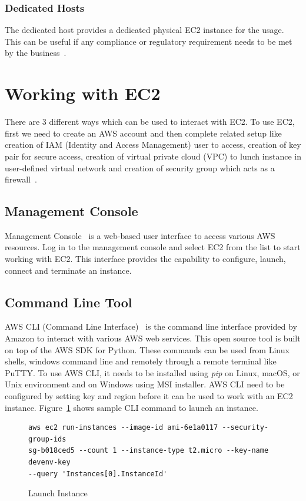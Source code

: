 \subsubsection{Dedicated Hosts} 
The dedicated host provides a dedicated physical EC2 instance for the
usage. This can be useful if any compliance or regulatory requirement
needs to be met by the
business~\cite{hid-sp18-402-www-aws-ec2Pricing}.

\section{Working with EC2}
There are 3 different ways which can be used to interact with EC2. To
use EC2, first we need to create an AWS account and then complete
related setup like creation of IAM (Identity and Access Management)
user to access, creation of key pair for secure access, creation of
virtual private cloud (VPC) to lunch instance in user-defined virtual
network and creation of security group which acts as a
firewall~\cite{hid-sp18-402-www-aws-ec2-setup}.

\subsection{Management Console}
Management Console~\cite{hid-sp18-402-www-aws-ec2-gettingStarted} is a
web-based user interface to access various AWS resources. Log in to
the management console and select EC2 from the list to start working
with EC2. This interface provides the capability to configure, launch,
connect and terminate an instance.

\subsection{Command Line Tool}
AWS CLI (Command Line Interface)~\cite{hid-sp18-402-www-aws-ec2-cli}
is the command line interface provided by Amazon to interact with
various AWS web services. This open source tool is built on top of the
AWS SDK for Python. These commands can be used from Linux shells,
windows command line and remotely through a remote terminal like
PuTTY. To use AWS CLI, it needs to be installed using \emph{pip} on
Linux, macOS, or Unix environment and on Windows using MSI
installer. AWS CLI need to be configured by setting key and region
before it can be used to work with an EC2 instance.
Figure~\ref{c:cli-launch} shows sample CLI command to launch an
instance.
\begin{figure}[htb]
\begin{verbatim}
aws ec2 run-instances --image-id ami-6e1a0117 --security-group-ids
sg-b018ced5 --count 1 --instance-type t2.micro --key-name devenv-key
--query 'Instances[0].InstanceId'
\end{verbatim}
\caption{Launch Instance~\cite{hid-sp18-402-www-aws-ec2-cli}}
\label{c:cli-launch}
\end{figure}

